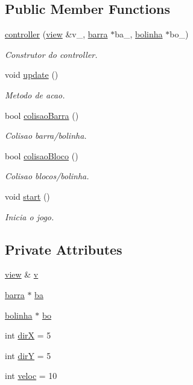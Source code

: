 \subsection*{Public Member Functions}
\begin{DoxyCompactItemize}
\item 
\hyperlink{classcontroller_a5179368251d444a67542bf506ffa6b9c}{controller} (\hyperlink{classview}{view} \&v\+\_\+, \hyperlink{classbarra}{barra} $\ast$ba\+\_\+, \hyperlink{classbolinha}{bolinha} $\ast$bo\+\_\+)
\begin{DoxyCompactList}\small\item\em Construtor do controller. \end{DoxyCompactList}\item 
void \hyperlink{classcontroller_ac0373785a91924ce3d480c1c7dedbd99}{update} ()
\begin{DoxyCompactList}\small\item\em Metodo de acao. \end{DoxyCompactList}\item 
bool \hyperlink{classcontroller_aaaef2bd34f643183bcd6fad64bea1005}{colisao\+Barra} ()
\begin{DoxyCompactList}\small\item\em Colisao barra/bolinha. \end{DoxyCompactList}\item 
bool \hyperlink{classcontroller_ac227dd1b72111d1c6da3362d60aa25d6}{colisao\+Bloco} ()
\begin{DoxyCompactList}\small\item\em Colisao blocos/bolinha. \end{DoxyCompactList}\item 
void \hyperlink{classcontroller_a03872ff488ab704038e14226a8e031ea}{start} ()
\begin{DoxyCompactList}\small\item\em Inicia o jogo. \end{DoxyCompactList}\end{DoxyCompactItemize}
\subsection*{Private Attributes}
\begin{DoxyCompactItemize}
\item 
\hyperlink{classview}{view} \& \hyperlink{classcontroller_a6ff845413a797ed4beff34d3cb6b7774}{v}
\item 
\hyperlink{classbarra}{barra} $\ast$ \hyperlink{classcontroller_af46499f5a9ef1afc0c95d899fb128aa1}{ba}
\item 
\hyperlink{classbolinha}{bolinha} $\ast$ \hyperlink{classcontroller_ae3e29aaa568c3d374b65416fd49649c5}{bo}
\item 
int \hyperlink{classcontroller_ab7bee2a38038001992ab877caccc1a47}{dirX} = 5
\item 
int \hyperlink{classcontroller_a136888a5f98296f5266a01330e2881e7}{dirY} = 5
\item 
int \hyperlink{classcontroller_ae1229353be5404b8decda1e8775292c4}{veloc} = 10
\end{DoxyCompactItemize}


